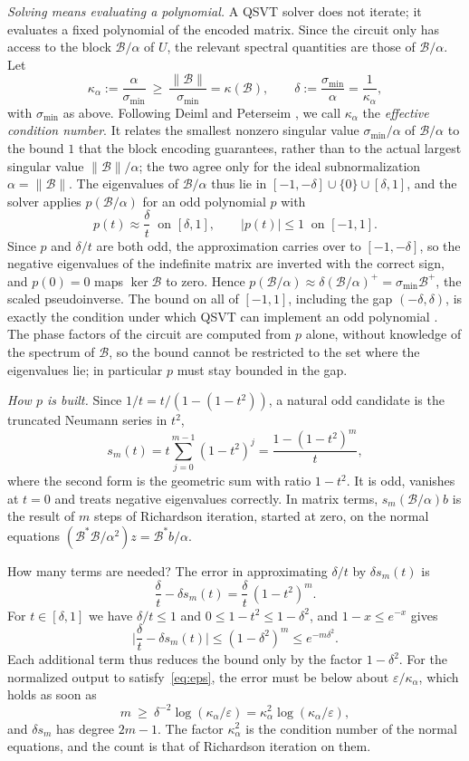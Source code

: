\documentclass[11pt,a4paper]{article}
\newcommand{\B}{\mathcal{B}}
\theoremstyle{remark}
\begin{document}
\emph{Solving means evaluating a polynomial.} A QSVT solver does not iterate;
it evaluates a fixed polynomial of the encoded matrix. Since the circuit only
has access to the block $\B/\alpha$ of $U$, the relevant spectral quantities
are those of $\B/\alpha$. Let
\[
\kappa_\alpha:=\frac{\alpha}{\sigma_{\min}}\ \ge\ \frac{\|\B\|}{\sigma_{\min}}=\kappa(\B),
\qquad \delta:=\frac{\sigma_{\min}}{\alpha}=\frac1{\kappa_\alpha},
\]
with $\sigma_{\min}$ as above. Following Deiml and Peterseim \cite[Def.~4.1]{DP26}, we call $\kappa_\alpha$ the \emph{effective
condition number}. It relates the smallest nonzero singular value
$\sigma_{\min}/\alpha$ of $\B/\alpha$ to the bound $1$ that the block encoding
guarantees, rather than to the actual largest singular value $\|\B\|/\alpha$;
the two agree only for the ideal subnormalization $\alpha=\|\B\|$. The
eigenvalues of $\B/\alpha$ thus lie in $[-1,-\delta]\cup\{0\}\cup[\delta,1]$, and the
solver applies $p(\B/\alpha)$ for an odd polynomial $p$ with
\begin{equation}\label{eq:pconditions}
p(t)\approx\frac{\delta}{t}\ \text{ on }[\delta,1],\qquad |p(t)|\le1\ \text{ on }[-1,1].
\end{equation}
Since $p$ and $\delta/t$ are both odd, the approximation carries over to
$[-1,-\delta]$, so the negative eigenvalues of the indefinite matrix are inverted
with the correct sign, and $p(0)=0$ maps $\ker\B$ to zero. Hence
$p(\B/\alpha)\approx\delta(\B/\alpha)^+=\sigma_{\min}\B^+$, the scaled pseudoinverse. The bound
on all of $[-1,1]$, including the gap $(-\delta,\delta)$, is exactly the condition
under which QSVT can implement an odd polynomial \cite{GSLW19}. The phase
factors of the circuit are computed from $p$ alone, without knowledge of the
spectrum of $\B$, so the bound cannot be restricted to the set where the
eigenvalues lie; in particular $p$ must stay bounded in the gap.

\emph{How $p$ is built.} Since $1/t=t/(1-(1-t^2))$, a natural odd candidate is the
truncated Neumann series in $t^2$,
\[
s_m(t)=t\sum_{j=0}^{m-1}(1-t^2)^j=\frac{1-(1-t^2)^m}{t},
\]
where the second form is the geometric sum with ratio $1-t^2$. It is odd,
vanishes at $t=0$ and treats negative eigenvalues correctly. In matrix
terms, $s_m(\B/\alpha)b$ is the result of $m$ steps of Richardson iteration,
started at zero, on the normal equations $(\B^*\B/\alpha^2)z=\B^*b/\alpha$.

How many terms are needed? The error in approximating $\delta/t$ by $\delta s_m(t)$ is
\[
\frac\delta t-\delta s_m(t)=\frac{\delta}{t}\,(1-t^2)^m .
\]
For $t\in[\delta,1]$ we have $\delta/t\le1$ and $0\le1-t^2\le1-\delta^2$, and $1-x\le e^{-x}$ gives
\[
\Big|\frac\delta t-\delta s_m(t)\Big|\le(1-\delta^2)^m\le e^{-m\delta^2}.
\]
Each additional term thus reduces the bound only by the factor $1-\delta^2$. For
the normalized output to satisfy~\eqref{eq:eps}, the error must be below
about $\varepsilon/\kappa_\alpha$, which holds as soon as
\[
m\ \ge\ \delta^{-2}\log(\kappa_\alpha/\varepsilon)=\kappa_\alpha^2\log(\kappa_\alpha/\varepsilon),
\]
and $\delta s_m$ has degree $2m-1$. The factor $\kappa_\alpha^2$ is the condition number of
the normal equations, and the count is that of Richardson iteration on
them.
\end{document}
